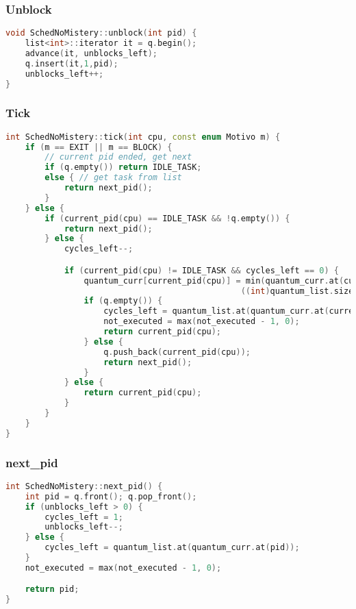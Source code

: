 \pagebreak

\subsubsection{Unblock}
\begin{lstlisting}[language=C++, breaklines=true]
void SchedNoMistery::unblock(int pid) {
	list<int>::iterator it = q.begin();
	advance(it, unblocks_left);
	q.insert(it,1,pid);
	unblocks_left++;
}
\end{lstlisting}

\subsubsection{Tick}
\begin{lstlisting}[language=C++, breaklines=true]
int SchedNoMistery::tick(int cpu, const enum Motivo m) {
	if (m == EXIT || m == BLOCK) {
		// current pid ended, get next
		if (q.empty()) return IDLE_TASK;
		else { // get task from list
			return next_pid();
		}
	} else {
		if (current_pid(cpu) == IDLE_TASK && !q.empty()) {
			return next_pid();
		} else {
			cycles_left--;

			if (current_pid(cpu) != IDLE_TASK && cycles_left == 0) {
				quantum_curr[current_pid(cpu)] = min(quantum_curr.at(current_pid(cpu))+1,
												((int)quantum_list.size())-1);
				if (q.empty()) {
					cycles_left = quantum_list.at(quantum_curr.at(current_pid(cpu)));
					not_executed = max(not_executed - 1, 0);
					return current_pid(cpu);
				} else {
					q.push_back(current_pid(cpu));
					return next_pid();
				}
			} else {
				return current_pid(cpu);
			}
		}
	}
}
\end{lstlisting}

\subsubsection{next\_pid}
\begin{lstlisting}[language=C++, breaklines=true]
int SchedNoMistery::next_pid() {
	int pid = q.front(); q.pop_front();
	if (unblocks_left > 0) {
		cycles_left = 1;
		unblocks_left--;
	} else {
		cycles_left = quantum_list.at(quantum_curr.at(pid));
	}
	not_executed = max(not_executed - 1, 0);

	return pid;
}
\end{lstlisting}